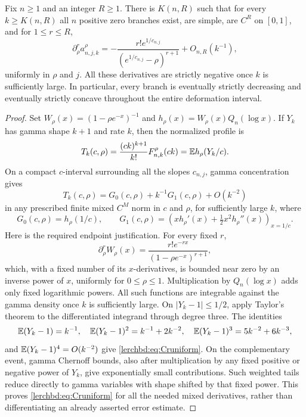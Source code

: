 \begin{theorem}\label{lerchbd:thm:eventual}
Fix $n\ge1$ and an integer $R\ge1$. There is $K(n,R)$ such that for every $k\ge K(n,R)$ all $n$ positive zero branches exist, are simple, are $C^R$ on $[0,1]$, and for $1\le r\le R$,
\begin{equation}\label{lerchbd:eq:allnegative}
 \partial_\rho^r a_{n,j,k}^{\rho}
 =-\frac{r!e^{1/c_{n,j}}}{(e^{1/c_{n,j}}-\rho)^{r+1}}+O_{n,R}(k^{-1}),
\end{equation}
uniformly in $\rho$ and $j$. All these derivatives are strictly negative once $k$ is sufficiently large. In particular, every branch is eventually strictly decreasing and eventually strictly concave throughout the entire deformation interval.
\end{theorem}
\begin{proof}
Set $W_\rho(x)=(1-\rho e^{-x})^{-1}$ and $h_\rho(x)=W_\rho(x)Q_n(\log x)$. If $Y_k$ has gamma shape $k+1$ and rate $k$, then the normalized profile is
\begin{equation}\label{lerchbd:eq:gamma-profile}
 T_k(c,\rho)=\frac{(ck)^{k+1}}{k!}F_{n,k}^{\rho}(ck)
 =\mathbb E h_\rho(Y_k/c).
\end{equation}
On a compact $c$-interval surrounding all the slopes $c_{n,j}$, gamma concentration gives
\begin{equation}\label{lerchbd:eq:Cruniform}
 T_k(c,\rho)=G_0(c,\rho)+k^{-1}G_1(c,\rho)+O(k^{-2})
\end{equation}
in any prescribed finite mixed $C^M$ norm in $c$ and $\rho$, for sufficiently large $k$, where
\[
 G_0(c,\rho)=h_\rho(1/c),\qquad
 G_1(c,\rho)=\left(xh_\rho'(x)+\tfrac12x^2h_\rho''(x)\right)_{x=1/c}.
\]
Here is the required endpoint justification. For every fixed $r$,
\[
 \partial_\rho^rW_\rho(x)=\frac{r!e^{-rx}}{(1-\rho e^{-x})^{r+1}},
\]
which, with a fixed number of its $x$-derivatives, is bounded near zero by an inverse power of $x$, uniformly for $0\le\rho\le1$. Multiplication by $Q_n(\log x)$ adds only fixed logarithmic powers. All such functions are integrable against the gamma density once $k$ is sufficiently large. On $|Y_k-1|\le1/2$, apply Taylor's theorem to the differentiated integrand through degree three. The identities
\[
 \mathbb E(Y_k-1)=k^{-1},\quad
 \mathbb E(Y_k-1)^2=k^{-1}+2k^{-2},\quad
 \mathbb E(Y_k-1)^3=5k^{-2}+6k^{-3},
\]
and $\mathbb E(Y_k-1)^4=O(k^{-2})$ give \eqref{lerchbd:eq:Cruniform}. On the complementary event, gamma Chernoff bounds, also after multiplication by any fixed positive or negative power of $Y_k$, give exponentially small contributions. Such weighted tails reduce directly to gamma variables with shape shifted by that fixed power. This proves \eqref{lerchbd:eq:Cruniform} for all the needed mixed derivatives, rather than differentiating an already asserted error estimate.


\end{proof}
